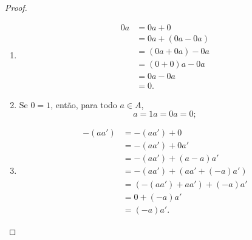 \begin{proof}
	\begin{enumerate}
	\item
		\begin{align*}
		0 a &= 0 a + 0 \\
			&= 0 a + (0 a - 0 a) \\
			&= (0 a + 0 a) - 0 a \\
			&= (0+0) a - 0 a \\
			&= 0 a - 0 a \\
			&= 0.
		\end{align*}
	
	\item Se $0=1$, então, para todo $a \in A$,
		\begin{equation*}
		a = 1a = 0a = 0;
		\end{equation*}	
	
	\item
		\begin{align*}
		-(a a') &= -(a a') + 0 \\
			&= -(a a') + 0 a' \\
			&= -(a a') + (a - a) a' \\
			&= -(a a') + (a a' + (-a) a') \\
			&= (-(a a') + a a') + (-a) a' \\
			&= 0 + (-a) a' \\
			&= (-a) a'.
		\end{align*}
	\end{enumerate}
\end{proof}

